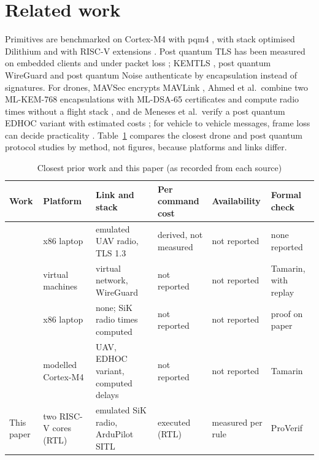 \documentclass[conference]{IEEEtran}
\begin{document}
\section{Related work}
\label{sec:rw}
Primitives are benchmarked on Cortex-M4 with pqm4 \cite{pqm4}, with stack optimised Dilithium \cite{greconici21} and with RISC-V extensions \cite{alkim20,fritzmann20}. Post quantum TLS has been measured on embedded clients \cite{burstinghaus20} and under packet loss \cite{paquin20,sikeridis20}; KEMTLS \cite{kemtls20,kemtlspdk21}, post quantum WireGuard and post quantum Noise \cite{pqwg21,pqnoise22} authenticate by encapsulation instead of signatures. For drones, MAVSec encrypts MAVLink \cite{mavsec19}, Ahmed et al.\ combine two ML-KEM-768 encapsulations with ML-DSA-65 certificates and compute radio times without a flight stack \cite{ahmed26}, and de Meneses et al.\ verify a post quantum EDHOC variant with estimated costs \cite{meneses26}; for vehicle to vehicle messages, frame loss can decide practicality \cite{twardokus24}. Table~\ref{tab:rw} compares the closest drone and post quantum protocol studies by method, not figures, because platforms and links differ.

\begin{table}[t]
\centering
\caption{Closest prior work and this paper (as recorded from each source)}
\label{tab:rw}
\setlength{\tabcolsep}{2pt}
\footnotesize
\begin{tabular}{llllll}
\toprule
Work & Platform & Link and stack & Per command cost & Availability & Formal check \\
\midrule
\cite{hyoung26} & x86 laptop & emulated UAV radio, TLS 1.3 & derived, not measured & not reported & none reported \\
\cite{pqwg21} & virtual machines & virtual network, WireGuard & not reported & not reported & Tamarin, with replay \\
\cite{ahmed26} & x86 laptop & none; SiK radio times computed & not reported & not reported & proof on paper \\
\cite{meneses26} & modelled Cortex-M4 & UAV, EDHOC variant, computed delays & not reported & not reported & Tamarin \\
This paper & two RISC-V cores (RTL) & emulated SiK radio, ArduPilot SITL & executed (RTL) & measured per rule & ProVerif \\
\bottomrule
\end{tabular}
\end{table}
\end{document}

